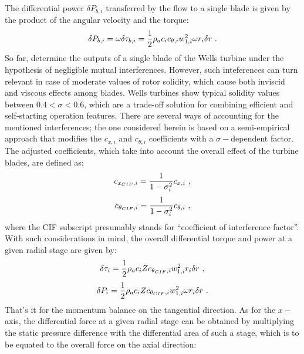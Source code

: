 The differential power $\delta{P_{b,i}}$ transferred by the flow to a single blade is given by the product of the angular velocity and the torque:
\begin{equation}{\label{eq:differential_power_single_blade}}
	\delta{P_{b,i}}=\omega\delta\tau_{b,i}=\frac{1}{2}\rho_{a}c_{i}c_{\theta,i}w_{1,i}^{2}\omega{r_{i}}\delta{r} \ .
\end{equation}
So far,  determine the outputs of a single blade of the Wells turbine under the hypothesis of negligible mutual interferences. However, such inteferences can turn relevant in case of moderate values of rotor solidity, which cause both inviscid and viscous effects among blades. Wells turbines show typical solidity values between $0.4<\sigma<0.6$, which are a trade-off solution for combining efficient and self-starting operation features. There are several ways of accounting for the mentioned interferences; the one considered herein is based on a semi-empirical approach that modifies the $c_{x,i}$ and $c_{\theta,i}$ coefficients with a $\sigma-$dependent factor. The adjusted coefficients, which take into account the overall effect of the turbine blades, are defined as:
\begin{equation}{\label{eq:cxcif_definition}}
	c_{x_{CIF},i}=\frac{1}{1-\sigma_{i}^{2}}c_{x,i} \ ,
\end{equation}
\begin{equation}{\label{eq:cthetacif_definition}}
	c_{\theta_{CIF},i}=\frac{1}{1-\sigma_{i}^{2}}c_{\theta,i} \ ,
\end{equation}
where the CIF subscript presumably stands for ``coefficient of interference factor''. With such considerations in mind, the overall differential torque and power at a given radial stage are given by:
\begin{equation}{\label{eq:differential_torque}}
	\delta\tau_{i} = \frac{1}{2}\rho_{a}c_{i}Zc_{\theta_{CIF},i}w_{1,i}^{2}r_{i}\delta{r} \ ,
\end{equation}
\begin{equation}{\label{eq:differential_power}}
	\delta{P_{i}} = \frac{1}{2}\rho_{a}c_{i}Zc_{\theta_{CIF},i}w_{1,i}^{2}\omega{r_{i}}\delta{r} \ .
\end{equation}
That's it for the momentum balance on the tangential direction. As for the $x-$axis, the differential force at a given radial stage can be obtained by multiplying the static pressure difference with the differential area of such a stage, which is to be equated to the overall force on the axial direction:
